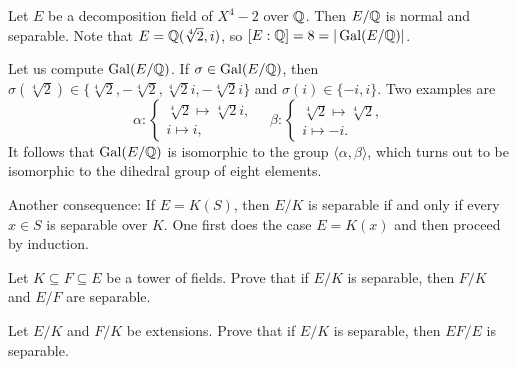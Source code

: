 \begin{example}
    Let $E$ be a decomposition field of $X^4-2$ over $\mathbb{Q}$. 
    Then $E/\mathbb{Q}$ is normal and separable. Note that
    $E=\mathbb{Q}(\sqrt[4]{2},i)$, so $[E:\mathbb{Q}]=8=|\operatorname{Gal}(E/\mathbb{Q})|$. 
    
    Let us compute
    $\operatorname{Gal}(E/\mathbb{Q})$. If $\sigma\in\operatorname{Gal}(E/\mathbb{Q})$, then 
    $\sigma(\sqrt[4]{2})\in\{\sqrt[4]{2},-\sqrt[4]{2},\sqrt[4]{2}i,-\sqrt[4]{2}i\}$ and 
    $\sigma(i)\in\{-i,i\}$. Two examples are 
    \[
    \alpha\colon\begin{cases}
    \sqrt[4]{2}\mapsto\sqrt[4]{2}i,\\
    i\mapsto i,
    \end{cases}
    \quad
    \beta\colon\begin{cases}
    \sqrt[4]{2}\mapsto\sqrt[4]{2},\\
    i\mapsto -i.
    \end{cases}
    \]
    It follows that 
    $\operatorname{Gal}(E/\mathbb{Q})$ is isomorphic to the group $\langle\alpha,\beta\rangle$, which turns out to be
    isomorphic to the dihedral group
    of eight elements. 
\end{example}

Another consequence: If $E=K(S)$, then $E/K$ is separable if and only if
every $x\in S$ is separable over $K$. One first does the case $E=K(x)$ 
and then proceed by induction. 

\begin{exercise}
\label{xca:separable1}
    Let $K\subseteq F\subseteq E$ be a tower of fields. Prove that 
    if $E/K$ is separable, then $F/K$ and $E/F$ are separable. 
\end{exercise}

\begin{exercise}
\label{xca:separable2}
    Let $E/K$ and $F/K$ be extensions. Prove that if $E/K$ is separable, 
    then $EF/E$ is separable. 
\end{exercise}


